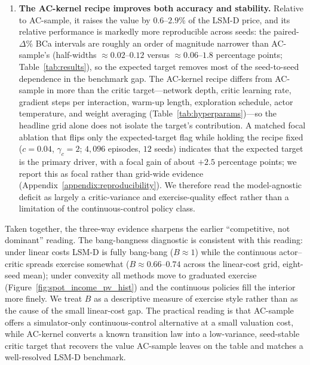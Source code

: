 \documentclass[a4paper,fleqn]{cas-dc}
\begin{document}
\begin{enumerate}
    \item \textbf{The AC-kernel recipe improves both accuracy and stability.} Relative to AC-sample, it raises the value by $0.6$--$2.9\%$ of the LSM-D price, and its relative performance is markedly more reproducible across seeds: the paired-$\Delta\%$ BCa intervals are roughly an order of magnitude narrower than AC-sample's (half-widths $\approx 0.02$--$0.12$ versus $\approx 0.06$--$1.8$ percentage points; Table~\ref{tab:results}), so the expected target removes most of the seed-to-seed dependence in the benchmark gap. The AC-kernel recipe differs from AC-sample in more than the critic target---network depth, critic learning rate, gradient steps per interaction, warm-up length, exploration schedule, actor temperature, and weight averaging (Table~\ref{tab:hyperparams})---so the headline grid alone does not isolate the target's contribution. A matched focal ablation that flips only the expected-target flag while holding the recipe fixed ($c=0.04$, $\gamma_c=2$; $4{,}096$ episodes, $12$ seeds) indicates that the expected target is the primary driver, with a focal gain of about $+2.5$ percentage points; we report this as focal rather than grid-wide evidence (Appendix~\ref{appendix:reproducibility}). We therefore read the model-agnostic deficit as largely a critic-variance and exercise-quality effect rather than a limitation of the continuous-control policy class.
\end{enumerate}

Taken together, the three-way evidence sharpens the earlier ``competitive, not dominant'' reading. The bang-bangness diagnostic is consistent with this reading: under linear costs LSM-D is fully bang-bang ($B\approx 1$) while the continuous actor--critic spreads exercise somewhat ($B\approx 0.66$--$0.74$ across the linear-cost grid, eight-seed mean); under convexity all methods move to graduated exercise (Figure~\ref{fig:spot_income_pv_hist}) and the continuous policies fill the interior more finely. We treat $B$ as a descriptive measure of exercise style rather than as the cause of the small linear-cost gap. The practical reading is that AC-sample offers a simulator-only continuous-control alternative at a small valuation cost, while AC-kernel converts a known transition law into a low-variance, seed-stable critic target that recovers the value AC-sample leaves on the table and matches a well-resolved LSM-D benchmark.
\end{document}

